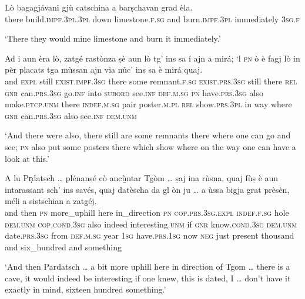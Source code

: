 \begin{linenumbers}
\gll Lò bagagjávani gjù catschina a barṣchavan grad èla.   \\
there build.\textsc{impf.3pl.3pl} down limestone.\textsc{f.sg} and  burn.\textsc{impf.3pl} immediately \textsc{3sg.f}\\
\end{linenumbers}
\medskip
\glt `There they would mine limestone and burn it immediately.'
\medskip

\begin{linenumbers}
\gll Ad i aun èra lò, zatgé rastònza ṣè aun lò tg’ ins sa í ajn a mirá; `l \textsc{pn} ò è fagj\footnotemark{} lò in pèr placats tga mùssan ajn via nùc’ ins sa è mirá quaj.\\
and \textsc{expl} still \textsc{exist.impf.3sg} there some remnant.\textsc{f.sg} \textsc{exist.prs.3sg} still there \textsc{rel} \textsc{gnr} can.\textsc{prs.3sg} go.\textsc{inf} into \textsc{subord} see.\textsc{inf} \textsc{def.m.sg} \textsc{pn} have.\textsc{prs.3sg} also make.\textsc{ptcp.unm} there \textsc{indef.m.sg} pair poster.\textsc{m.pl} \textsc{rel} show.\textsc{prs.3pl} in way where \textsc{gnr} can.\textsc{prs.3sg} also see.\textsc{inf} \textsc{dem.unm} \\
\end{linenumbers}
\medskip
\glt `And there were also, there still are some remnants there where one can go and see; \textsc{pn} also put some posters there which show where on the way one can have a look at this.'
\medskip

\begin{linenumbers}
\gll A lu Pr̩datsch … plénansé cò ancù̱ntar Tgòm … ṣaj ina rùsna, quaj fùṣ è aun intarassant sch’ ins savés, quaj datèscha da gl òn ju … a ùssa bigja grat prèsèn, méli a sistschian a zatgéj.   \\
and then \textsc{pn} {} more\_uphill here in\_direction \textsc{pn} {} \textsc{cop.prs.3sg.expl} \textsc{indef.f.sg} hole \textsc{dem.unm} \textsc{cop.cond.3sg} also indeed interesting.\textsc{unm} if \textsc{gnr} know.\textsc{cond.3sg} \textsc{dem.unm} date.\textsc{prs.3sg} from \textsc{def.m.sg} year \textsc{1sg} {} have.\textsc{prs.1sg} now \textsc{neg} just present thousand and six\_hundred and something\\
\end{linenumbers}
\medskip
\glt `And then Pardatsch … a bit more uphill here in direction of Tgom … there is a cave, it would indeed be interesting if one knew, this is dated, I … don't have it exactly in mind, sixteen hundred something.'
\medskip

